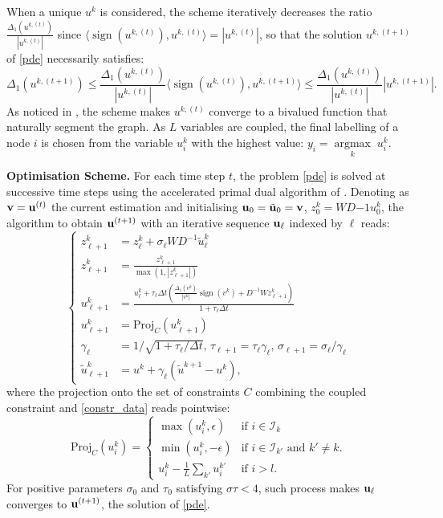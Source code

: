 \documentclass[runningheads]{llncs}
\DeclareMathOperator{\sign}{sign}
\DeclareMathOperator{\argmax}{argmax}
\newcommand{\uargmax}[1]{\underset{#1}{\argmax}\;}
\begin{document}
When a unique $u^k$ is considered, the scheme iteratively decreases the ratio $\frac{\Delta_1 (u^{k,(t)})}{|u^{k,(t)}|}$ since $\langle \sign(u^{k,(t)}), u^{k,(t)}\rangle=|u^{k,(t)}|$, so that the solution $u^{k,(t+1)}$ of \eqref{pde} necessarily satisfies:
\begin{equation}
\Delta_1 (u^{k,(t+1)})\leq \frac{\Delta_1 (u^{k,(t)})}{|u^{k,(t)}|}\langle \sign(u^{k,(t)}), u^{k,(t+1)}\rangle \leq \frac{\Delta_1 (u^{k,(t)})}{|u^{k,(t)}|}|u^{k,(t+1)}|.
\end{equation}
As noticed in \cite{Feld2019}, the  scheme  makes $u^{k,(t)}$ converge to a bivalued function that naturally segment the graph. As $L$  variables are coupled, the final labelling of a node $i$ is chosen from   the variable $u_i^k$  with the highest value: $y_i=\uargmax{k} u_i ^k$.

\textbf{Optimisation Scheme.} For each time step $t$, the problem \eqref{pde} is solved at successive time steps using the accelerated primal dual algorithm of \cite{chambolle2011first}. Denoting as ${\bf v}={\bf u}^{(t)}$ the current estimation and initialising ${\bf u}_0=\tilde{\bf u}_0={\bf v}$, $z^{k}_0=WD{-1}u^k_0$, the algorithm to obtain ${\bf u}^{(t+1)}$ with an iterative sequence ${\bf u}_{\ell}$ indexed by $\ell$ reads:
$$\left\{\begin{array}{lll}
z^{k}_{\ell+1}&=z^k_\ell+\sigma_\ell WD^{-1} {\tilde u}^k_{\ell}\\
z^{k}_{\ell+1}&=\frac{z^{k}_{\ell+1}}{\max(1,|z^{k}_{\ell+1}|)}\\
u^{k}_{\ell+1}&=\frac{u^k_{\ell}+\tau_\ell\Delta t\left(\frac{\Delta_1 (v^{k})}{|v^{k}|} \sign(v^{k})+D^{-1}W z^{k}_{\ell+1}\right)}{1+\tau_\ell\Delta t}\\
u^{k}_{\ell+1}&=\textrm{Proj}_C(u^{k}_{\ell+1})\\
\gamma_\ell&=1/\sqrt{1+\tau_\ell/\Delta t},\, \tau_{\ell+1}=\tau_\ell\gamma_\ell,\, \sigma_{\ell+1}=\sigma_\ell/\gamma_\ell\\
\tilde u^{k}_{\ell+1}&=u^{k}+\gamma_\ell(\tilde u^{k+1}- u^{k}),
\end{array}\right.$$
where the projection onto the set of constraints $C$ combining the coupled constraint and \eqref{constr_data} reads pointwise: \begin{equation}\label{proj_constr}
\textrm{Proj}_C(u^k_i)=\left\{\begin{array}{ll}
\max(u^k_i, \epsilon)&\textrm{if }i\in\mathcal I_k\\
\min(u^k_i,- \epsilon)&\textrm{if }i\in\mathcal I_{k'} \textrm{ and }k'\neq k.\\
u^k_i-\frac1L\sum_{k'}u^{k'}_i&\textrm{if }i>l.
\end{array}
\right.
\end{equation}
For positive parameters $\sigma_0$ and $\tau_0$ satisfying $\sigma\tau<4$, such process makes ${\bf u}_{\ell}$ converges to ${\bf u}^{(t+1)}$,
the solution of \eqref{pde}.
\end{document}
